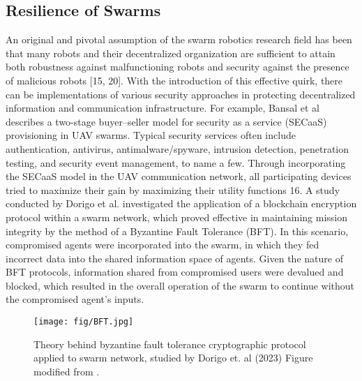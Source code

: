 \subsection*{Resilience of Swarms}
An original and pivotal assumption of the swarm robotics research field has been that many robots and their decentralized organization are sufficient to attain both robustness against malfunctioning robots and security against the presence of malicious robots [15, 20]. With the introduction of this effective quirk, there can be implementations of various security approaches in protecting decentralized information and communication infrastructure. For example, Bansal et al describes a two-stage buyer–seller model for security as a service (SECaaS) provisioning in UAV swarms. Typical security services often include authentication, antivirus, antimalware/spyware, intrusion detection, penetration testing, and security event management, to name a few. Through incorporating the SECaaS model in the UAV communication network, all participating devices tried to maximize their gain by maximizing their utility functions 16. 
A study conducted by Dorigo et al. investigated the application of a blockchain encryption protocol within a swarm network, which proved effective in maintaining mission integrity by the method of a Byzantine Fault Tolerance (BFT). In this scenario, compromised agents were incorporated into the swarm, in which they fed incorrect data into the shared information space of agents. Given the nature of BFT protocols, information shared from compromised users were devalued and blocked, which resulted in the overall operation of the swarm to continue without the compromised agent's inputs. 
\begin{figure}[!t]
  \centering
  \texttt{[image: fig/BFT.jpg]}
  \caption{Theory behind byzantine fault tolerance cryptographic protocol applied to swarm network, studied by Dorigo et. al (2023)  Figure
    modified from \cite{haury78}.}
  \label{fig:platforms}
\end{figure}
